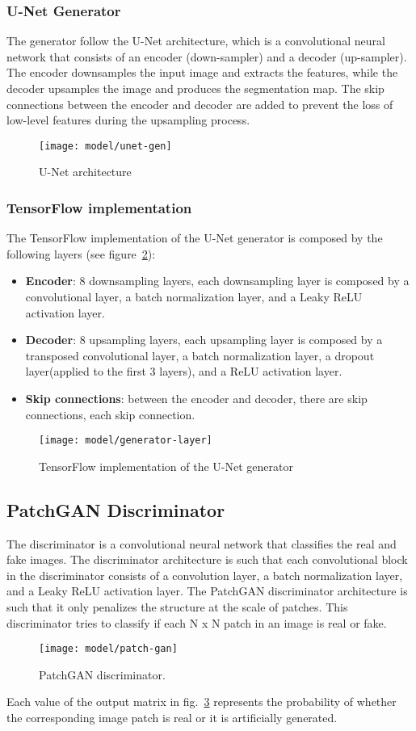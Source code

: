 \subsubsection{U-Net Generator}
The generator follow the U-Net architecture, which is a convolutional neural network that
consists of an encoder (down-sampler) and a decoder (up-sampler). The encoder downsamples the
input image and extracts the features, while the decoder upsamples the image and produces
the segmentation map. The skip connections between the encoder and decoder are added to
prevent the loss of low-level features during the upsampling process.
\begin{figure}[H]
    \centering
    \texttt{[image: model/unet-gen]}
    \caption{U-Net architecture}\label{fig:unet}
\end{figure}
\subsubsection{TensorFlow implementation}
The TensorFlow implementation of the U-Net generator is composed by the following layers (see figure~\ref{fig:gen-layer}):
\begin{itemize}
    \item \textbf{Encoder}: 8 downsampling layers, each downsampling layer is composed by a convolutional layer, a batch normalization layer, and a Leaky ReLU activation layer.
    \item \textbf{Decoder}: 8 upsampling layers, each upsampling layer is composed by a transposed convolutional layer, a batch normalization layer, a dropout layer(applied to the first 3 layers), and a ReLU activation layer.
    \item \textbf{Skip connections}: between the encoder and decoder, there are skip connections, each skip connection.
\end{itemize}
\begin{figure}[H]
    \centering
    \texttt{[image: model/generator-layer]}
    \caption{TensorFlow implementation of the U-Net generator}\label{fig:gen-layer}
\end{figure}
\subsection{PatchGAN Discriminator}\label{subsec:patchgan-discriminator}
The discriminator is a convolutional neural network that classifies the real and fake
images. The discriminator architecture is such that each convolutional block in the
discriminator consists of a convolution layer, a batch normalization layer, and a Leaky
ReLU activation layer. The PatchGAN discriminator architecture is such that it only penalizes
the structure at the scale of patches. This discriminator tries to classify if each N x N
patch in an image is real or fake.
\begin{figure}[H]
    \centering
    \texttt{[image: model/patch-gan]}
    \caption{PatchGAN discriminator.}\label{fig:patchgan}
\end{figure}
Each value of the output matrix in fig.~\ref{fig:patchgan} represents the probability of whether the corresponding image patch is real or it is artificially generated.
